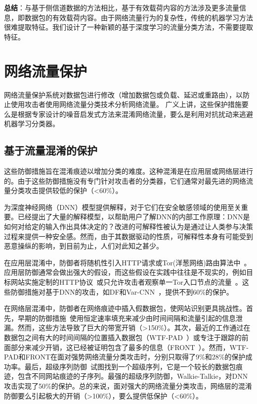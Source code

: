 \documentclass[degree=master,cjk-font=noto]{thuthesis}
\begin{document}
\textbf{总结}：与基于侧信道数据的方法相比，基于有效载荷内容的方法涉及更多流量信息，即数据包的有效载荷内容。由于网络流量行为的复杂性，传统的机器学习方法很难提取特征。我们设计了一种新颖的基于深度学习的流量分类方法，不需要提取特征。

\section{网络流量保护}

网络流量保护系统对数据包进行修改（增加数据包或负载、延迟或重路由），以防止使用攻击者使用网络流量分类技术分析网络流量。
广义上讲，这些保护措施要么是根据专家设计的噪音启发式方法来混淆网络流量，要么是利用对抗扰动来逃避机器学习分类器。

\subsection{基于流量混淆的保护}

这些防御措施旨在混淆痕迹以增加分类的难度。这种混淆是在应用层或网络层进行的。由于这些防御措施没有专门针对攻击者的分类器，它们通常对最先进的网络流量分类攻击提供较低的保护（<60\%）。

为深度神经网络（DNN）模型提供解释，对于它们在安全敏感领域的使用至关重要。已经提出了大量的解释模型，以帮助用户了解DNN的内部工作原理：DNN是如何对给定的输入作出具体决定的？改进的可解释性被认为是通过让人类参与决策过程来提供一种安全感。然而，由于其数据驱动的性质，可解释性本身有可能受到恶意操纵的影响，到目前为止，人们对此知之甚少。

在应用层混淆中，防御者将随机性引入HTTP请求或Tor(洋葱网络)路由算法中~\cite{CherubinHayesJuarez,TrafficSliver}。应用层防御通常会做出强大的假设，而这些假设在实践中往往是不现实的，例如目标网站实施定制的HTTP协议~\cite{CherubinHayesJuarez}或只允许攻击者观察单一Tor入口节点的流量~\cite{TrafficSliver}。这些防御措施对基于DNN的攻击，如DF和Var-CNN~\cite{df,var-cnn}，提供不到60\%的保护。

在网络层混淆中，防御者在网络痕迹中插入假数据包，使网站识别更具挑战性。首先，早期的防御措施~\cite{cs-buflo,2660362}使用恒定速率填充来减少由时间间隔和流量引起的信息泄漏。然而，这些方法导致了巨大的带宽开销（>150\%）。其次，最近的工作通过在数据包之间有大的时间间隔的位置插入数据包（WTF-PAD~\cite{10.1007}）或专注于跟踪的前面部分来减少开销，这已经被证明包含了最多的信息（FRONT~\cite{247654}）。然而，WTF-PAD和FRONT在面对强势网络流量分类攻击时，分别只取得了9\%和28\%的保护成功率。最后，超级序列防御~\cite{glove,203876}试图找到一个超级序列，它是一个较长的数据包痕迹，包含不同网站痕迹的子序列。最强的超级序列防御，Walkie-Talkie，对DNN攻击实现了50\%的保护。总的来说，面对强大的网络流量分类攻击，网络层的混淆防御要么引起极大的开销（>100\%），要么提供低保护（<60\%）。
\end{document}
